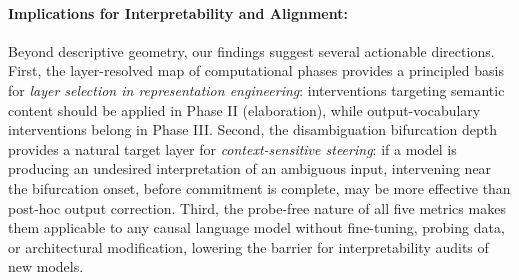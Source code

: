 \documentclass{article}
\begin{document}
\paragraph{Implications for Interpretability and Alignment:} Beyond descriptive geometry, our findings suggest several actionable directions. First, the layer-resolved map of computational phases provides a principled basis for \textit{layer selection in representation engineering}: interventions targeting semantic content should be applied in Phase II (elaboration), while output-vocabulary interventions belong in Phase III. Second, the disambiguation bifurcation depth provides a natural target layer for \textit{context-sensitive steering}: if a model is producing an undesired interpretation of an ambiguous input, intervening near the bifurcation onset, before commitment is complete, may be more effective than post-hoc output correction. Third, the probe-free nature of all five metrics makes them applicable to any causal language model without fine-tuning, probing data, or architectural modification, lowering the barrier for interpretability audits of new models.

\end{document}
